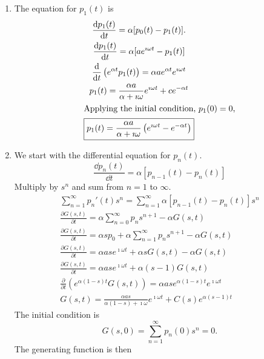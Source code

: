 \begin{Solution}
  \begin{enumerate}
  \item
    The equation for $p_1(t)$ is
    \begin{gather*}
      \frac{\mathrm{d} p_1(t)}{\mathrm{d} t} = \alpha [p_0(t) - p_1(t)].  \\
      \frac{\mathrm{d} p_1(t)}{\mathrm{d} t} = \alpha [a e^{\imath \omega t} - p_1(t)] \\
      \frac{\mathrm{d}}{\mathrm{d} t}\left(e^{\alpha t} p_1(t) \right) = \alpha a e^{\alpha t} 
      e^{\imath \omega t} \\
      p_1(t) = \frac{\alpha a}{\alpha + \imath \omega} e^{\imath \omega t} 
      + c e^{-\alpha t} \\
      \intertext{Applying the initial condition, $p_1(0) = 0$,}
      \boxed{p_1(t) = \frac{\alpha a}{\alpha + \imath \omega} \left(e^{\imath \omega t} 
          - e^{-\alpha t} \right) }
    \end{gather*}
  \item
    We start with the differential equation for $p_n(t)$.
    \[ \frac{\dd p_n(t)}{\dd t} = \alpha [p_{n-1}(t) - p_n(t)] \]
    Multiply by $s^n$ and sum from $n=1$ to $\infty$.
    \begin{gather*}
      \sum_{n = 1}^\infty p_n'(t) s^n = \sum_{n = 1}^\infty \alpha [p_{n-1}(t) - p_n(t)] s^n \\
      \frac{\partial G(s,t)}{\partial t} = \alpha \sum_{n = 0}^\infty p_n s^{n+1} 
      - \alpha G(s,t) \\
      \frac{\partial G(s,t)}{\partial t} = \alpha s p_0 + \alpha \sum_{n = 1}^\infty p_n s^{n+1} 
      - \alpha G(s,t) \\
      \frac{\partial G(s,t)}{\partial t} = \alpha a s e^{\imath \omega t} 
      + \alpha s G(s,t) - \alpha G(s,t) \\
      \frac{\partial G(s,t)}{\partial t} = \alpha a s e^{\imath \omega t} 
      + \alpha (s-1) G(s,t)  \\
      \frac{\partial}{\partial t} \left( e^{\alpha(1-s)t} G(s,t) \right) = \alpha a s 
      e^{\alpha(1-s)t} e^{\imath \omega t} \\
      G(s,t) = \frac{\alpha a s}{\alpha(1-s) + \imath \omega} e^{\imath \omega t}
      + C(s) e^{\alpha(s-1) t} 
    \end{gather*}
    The initial condition is
    \[ G(s,0) = \sum_{n = 1}^\infty p_n(0) s^n = 0. \]
    The generating function is then

\end{enumerate}
\end{Solution}
